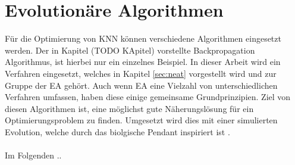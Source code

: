 \section{Evolutionäre Algorithmen}
Für die Optimierung von \ac{KNN} können verschiedene Algorithmen eingesetzt werden. Der in Kapitel (TODO KApitel) vorstellte Backpropagation Algorithmus, ist hierbei nur ein einzelnes Beispiel. In dieser Arbeit wird ein Verfahren eingesetzt, welches in Kapitel \ref{sec:neat} vorgestellt wird und zur Gruppe der \ac{EA} gehört. Auch wenn \ac{EA} eine Vielzahl von unterschiedlichen Verfahren umfassen, haben diese einige gemeinsame Grundprinzipien. Ziel von diesen Algorithmen ist, eine möglichst gute Näherungslösung für ein Optimierungsproblem zu finden. Umgesetzt wird dies mit einer simulierten Evolution, welche durch das biolgische Pendant inspiriert ist \cite{weicker2015evolutionare}.
\\\\
Im Folgenden .. 

